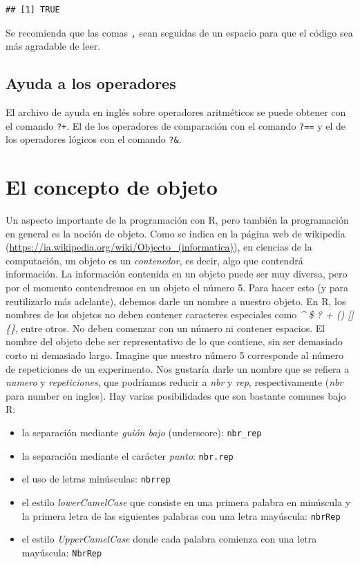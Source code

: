 \documentclass[
]{book}
\providecommand{\tightlist}{%
  \setlength{\itemsep}{0pt}\setlength{\parskip}{0pt}}
\begin{document}
\begin{verbatim}
## [1] TRUE
\end{verbatim}

Se recomienda que las comas \texttt{,} sean seguidas de un espacio para que el código sea más agradable de leer.

\hypertarget{ayuda-a-los-operadores}{%
\subsection{Ayuda a los operadores}\label{ayuda-a-los-operadores}}

El archivo de ayuda en inglés sobre operadores aritméticos se puede obtener con el comando \texttt{?\textquotesingle{}+\textquotesingle{}}. El de los operadores de comparación con el comando \texttt{?\textquotesingle{}==\textquotesingle{}} y el de los operadores lógicos con el comando \texttt{?\textquotesingle{}\&\textquotesingle{}}.

\hypertarget{l011object}{%
\section{El concepto de objeto}\label{l011object}}

Un aspecto importante de la programación con R, pero también la programación en general es la noción de objeto. Como se indica en la página web de wikipedia (\url{https://ia.wikipedia.org/wiki/Objecto_(informatica)}), en ciencias de la computación, un objeto es un \emph{contenedor}, es decir, algo que contendrá información. La información contenida en un objeto puede ser muy diversa, pero por el momento contendremos en un objeto el número 5. Para hacer esto (y para reutilizarlo más adelante), debemos darle un nombre a nuestro objeto. En R, los nombres de los objetos no deben contener caracteres especiales como \emph{\^{} \$ ? \textbar{} + () {[}{]} \{\}}, entre otros. No deben comenzar con un número ni contener espacios. El nombre del objeto debe ser representativo de lo que contiene, sin ser demasiado corto ni demasiado largo. Imagine que nuestro número 5 corresponde al número de repeticiones de un experimento. Nos gustaría darle un nombre que se refiera a \emph{numero} y \emph{repeticiones}, que podríamos reducir a \emph{nbr} y \emph{rep}, respectivamente (\emph{nbr} para number en ingles). Hay varias posibilidades que son bastante comunes bajo R:

\begin{itemize}
\tightlist
\item
  la separación mediante \emph{guión bajo} (underscore): \texttt{nbr\_rep}
\item
  la separación mediante el carácter \emph{punto}: \texttt{nbr.rep}
\item
  el uso de letras minúsculas: \texttt{nbrrep}
\item
  el estilo \emph{lowerCamelCase} que consiste en una primera palabra en minúscula y la primera letra de las siguientes palabras con una letra mayúscula: \texttt{nbrRep}
\item
  el estilo \emph{UpperCamelCase} donde cada palabra comienza con una letra mayúscula: \texttt{NbrRep}
\end{itemize}
\end{document}
